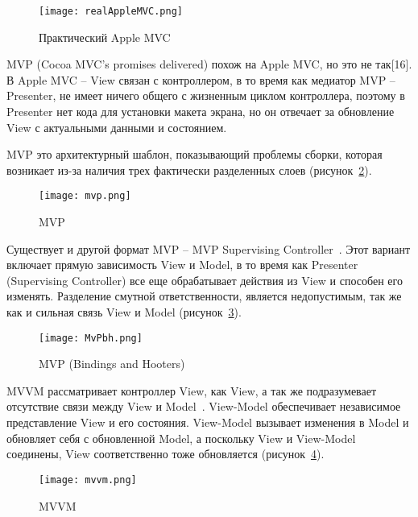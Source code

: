 \begin{figure}[H]
	\centering
	\texttt{[image: realAppleMVC.png]} 
	\caption{Практический Apple MVC}
	\label{fig:analysis:realAppleMVC}
\end{figure}

MVP (Cocoa MVC’s promises delivered) похож на Apple MVC, но это не
так[16]. В Apple MVC – View связан с контроллером, в то время как медиатор
MVP – Presenter, не имеет ничего общего с жизненным циклом контроллера,
поэтому в Presenter нет кода для установки макета экрана, но он отвечает за
обновление View с актуальными данными и состоянием. 

MVP это архитектурный шаблон, показывающий проблемы сборки,
которая возникает из-за наличия трех фактически разделенных слоев (рисунок~\ref{fig:analysis:mvpPic}).

\begin{figure}[H]
	\centering
	\texttt{[image: mvp.png]} 
	\caption{MVP}
	\label{fig:analysis:mvpPic}
\end{figure}

Существует и другой формат MVP – MVP Supervising Controller~\cite{mvcAppleReal}.
Этот вариант включает прямую зависимость View и Model, в то время как
Presenter (Supervising Controller) все еще обрабатывает действия из View и
способен его изменять. Разделение смутной ответственности, является
недопустимым, так же как и сильная связь View и Model (рисунок~\ref{fig:analysis:MvPbh}). 

\begin{figure}[H]
	\centering
	\texttt{[image: MvPbh.png]} 
	\caption{MVP (Bindings and Hooters)}
	\label{fig:analysis:MvPbh}
\end{figure}

MVVM рассматривает контроллер View, как View, а так же
подразумевает отсутствие связи между View и Model~\cite{mvvmApple}. View-Model
обеспечивает независимое представление View и его состояния. View-Model
вызывает изменения в Model и обновляет себя с обновленной Model, а
поскольку View и View-Model соединены, View соответственно тоже
обновляется (рисунок~\ref{fig:analysis:mvvm}). 

\begin{figure}[H]
	\centering
	\texttt{[image: mvvm.png]} 
	\caption{MVVM}
	\label{fig:analysis:mvvm}
\end{figure}

